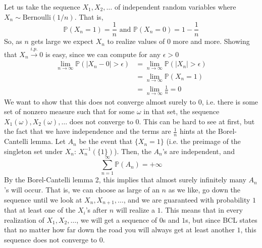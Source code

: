     \begin{example}
      Let us take the sequence $X_1, X_2, \ldots$ of independent random variables where $X_n \sim \mathrm{Bernoulli}(1/n)$. That is, 
      \begin{equation}
        \mathbb{P}(X_n = 1) = \frac{1}{n} \text{ and } \mathbb{P}(X_n = 0) = 1 - \frac{1}{n}
      \end{equation}
      So, as $n$ gets large we expect $X_n$ to realize values of $0$ more and more. Showing that $X_n \xrightarrow{i.p.} 0$ is easy, since we can compute for any $\epsilon > 0$
      \begin{align*}
        \lim_{n \rightarrow \infty} \mathbb{P}(|X_n - 0| > \epsilon) & = \lim_{n \rightarrow \infty} \mathbb{P}(|X_n| > \epsilon) \\
        & = \lim_{n \rightarrow \infty} \mathbb{P}(X_n = 1) \\
        & = \lim_{n \rightarrow \infty} \frac{1}{n} = 0
      \end{align*}
      We want to show that this does not converge almost surely to $0$, i.e. there is some set of nonzero measure such that for some $\omega$ in that set, the sequence $X_1 (\omega), X_2(\omega), \ldots$ does not converge to $0$. This can be hard to see at first, but the fact that we have independence and the terms are $\frac{1}{n}$ hints at the Borel-Cantelli lemma. Let $A_n$ be the event that $\{X_n = 1\}$ (i.e. the preimage of the singleton set under $X_n$: $X_n^{-1} ( \{1\})$). Then, the $A_n$'s are independent, and 
      \begin{equation}
        \sum_{n=1}^\infty \mathbb{P}(A_n) = +\infty
      \end{equation}
      By the Borel-Cantelli lemma 2, this implies that almost surely infinitely many $A_n$'s will occur. That is, we can choose as large of an $n$ as we like, go down the sequence until we look at $X_n, X_{n+1}, \ldots$, and we are guaranteed with probability $1$ that at least one of the $X_i$'s after $n$ will realize a $1$. This means that in every realization of $X_1, X_2, \ldots$, we will get a sequence of $0$s and $1$s, but since BCL states that no matter how far down the road you will always get at least another $1$, this sequence does not converge to $0$.  
    \end{example}

